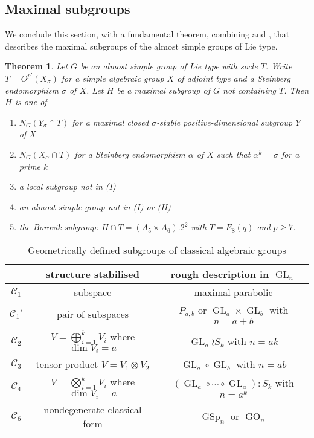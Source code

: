 \documentclass[11pt]{article}
\numberwithin{equation}{section}
\theoremstyle{shdefinition}
\theoremstyle{shplain}
\newtheorem{theorem}[definition]{Theorem}
\renewcommand{\a}{\alpha}
\newcommand{\s}{\sigma}
\newcommand{\C}{\mathcal{C}}
\newcommand{\<}{\langle}
\renewcommand{\>}{\rangle}
\renewcommand{\geq}{\geqslant}
\renewcommand{\:}{\colon}
\newcommand{\GL}{\operatorname{GL}}
\newcommand{\GSp}{\operatorname{GSp}}
\newcommand{\GO}{\operatorname{GO}}
\begin{document}
\subsection{Maximal subgroups} \label{ss:maximal}

We conclude this section, with a fundamental theorem, combining \cite[Theorem~2]{ref:LiebeckSeitz90} and \cite[Theorem~2]{ref:LiebeckSeitz98}, that describes the maximal subgroups of the almost simple groups of Lie type.

\begin{theorem} \label{thm:maximal}
Let $G$ be an almost simple group of Lie type with socle $T$. Write $T= O^{p'}(X_\s)$ for a simple algebraic group $X$ of adjoint type and a Steinberg endomorphism $\s$ of $X$. Let $H$ be a maximal subgroup of $G$ not containing $T$. Then $H$ is one of
\begin{enumerate}[{\rm (I)}]
\item $N_G(Y_\s \cap T)$ for a maximal closed $\s$-stable positive-dimensional subgroup $Y$ of $X$
\item $N_G(X_\a \cap T)$ for a Steinberg endomorphism $\a$ of $X$ such that $\a^k=\s$ for a prime $k$
\item a local subgroup not in (I)
\item an almost simple group not in (I) or (II)
\item the Borovik subgroup: $H \cap T = (A_5 \times A_6).2^2$ with $T = E_8(q)$ and $p \geq 7$.
\end{enumerate}
\end{theorem} 

\begin{table}
\caption{Geometrically defined subgroups of classical algebraic groups} \label{tab:maximal_classical}
\centering
\begin{tabular}{ccc}
\hline
       & structure stabilised                                   & rough description in $\GL_n$                               \\
\hline
$\C_1$ & subspace                                               & maximal parabolic                                          \\
$\C_1'$& pair of subspaces                                      & $P_{a,b}$ or $\GL_a \times \GL_b$ with $n=a+b$             \\
$\C_2$ & $V = \bigoplus_{i=1}^{k}V_i$ where $\dim{V_i}=a$       & ${\GL_a} \wr S_k$ with $n=ak$                              \\
$\C_3$ & tensor product $V=V_1 \otimes V_2$                     & $\GL_{a} \circ \GL_{b}$ with $n=ab$                        \\
$\C_4$ & $V = \bigotimes_{i=1}^{k}V_i$ where $\dim{V_i}=a$      & $(\GL_a \circ \cdots \circ \GL_a){:}S_k$ with $n=a^k$      \\
$\C_6$ & nondegenerate classical form                           & $\GSp_n$ or $\GO_n$                                        \\
\hline
\end{tabular}
\end{table}
\end{document}
